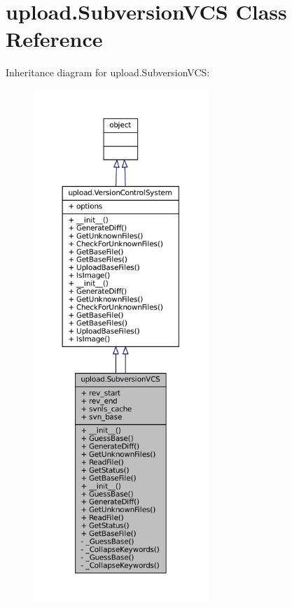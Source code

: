 \hypertarget{classupload_1_1SubversionVCS}{}\section{upload.\+Subversion\+V\+CS Class Reference}
\label{classupload_1_1SubversionVCS}


Inheritance diagram for upload.\+Subversion\+V\+CS\+:
\nopagebreak
\begin{figure}[H]
\begin{center}
\leavevmode
\includegraphics[height=550pt]{classupload_1_1SubversionVCS__inherit__graph}
\end{center}
\end{figure}



